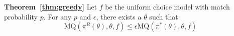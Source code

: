 \documentclass[11pt]{article}
\begin{document}

\textbf{Theorem~\ref{thm:greedy}}
Let $f$ be the uniform choice model with match probability $p$. 
For any $p$ and $\epsilon$, there exists a $\theta$ such that 
\begin{equation}
    \mathrm{MQ}(\pi^{R}(\theta),\theta,f)  \leq \epsilon \mathrm{MQ}(\pi^{*}(\theta),\theta,f)
\end{equation}
\end{document}
